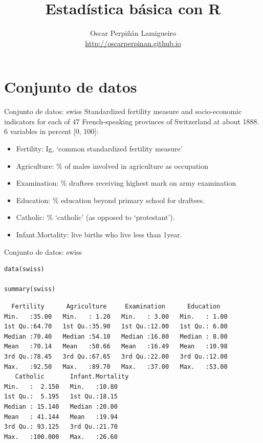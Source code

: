 \documentclass[xcolor={usenames,svgnames,dvipsnames}]{beamer}
\author{Oscar Perpiñán Lamigueiro \\ \url{http://oscarperpinan.github.io}}
\date{}
\title{Estadística básica con R}
\begin{document}
\maketitle

\section{Conjunto de datos}
\label{sec-1}

\begin{frame}[label=sec-1-1]{Conjunto de datos: swiss}
Standardized fertility measure and socio-economic indicators for
each of 47 French-speaking provinces of Switzerland at
about 1888. 6 variables in percent [0, 100]:

\begin{itemize}
\item \alert{Fertility}:         Ig, ‘common standardized fertility measure’
\item \alert{Agriculture}:       \% of males involved in agriculture as occupation
\item \alert{Examination}:       \% draftees receiving highest mark on army examination
\item \alert{Education}:         \% education beyond primary school for draftees.
\item \alert{Catholic}:          \% ‘catholic’ (as opposed to ‘protestant’).
\item \alert{Infant.Mortality}:  live births who live less than 1year.
\end{itemize}
\end{frame}
\begin{frame}[fragile,label=sec-1-2]{Conjunto de datos: swiss}
 \lstset{language=R,numbers=none}
\begin{lstlisting}
data(swiss)

summary(swiss)
\end{lstlisting}

\begin{verbatim}
  Fertility      Agriculture     Examination      Education    
Min.   :35.00   Min.   : 1.20   Min.   : 3.00   Min.   : 1.00  
1st Qu.:64.70   1st Qu.:35.90   1st Qu.:12.00   1st Qu.: 6.00  
Median :70.40   Median :54.10   Median :16.00   Median : 8.00  
Mean   :70.14   Mean   :50.66   Mean   :16.49   Mean   :10.98  
3rd Qu.:78.45   3rd Qu.:67.65   3rd Qu.:22.00   3rd Qu.:12.00  
Max.   :92.50   Max.   :89.70   Max.   :37.00   Max.   :53.00  
   Catholic       Infant.Mortality
Min.   :  2.150   Min.   :10.80   
1st Qu.:  5.195   1st Qu.:18.15   
Median : 15.140   Median :20.00   
Mean   : 41.144   Mean   :19.94   
3rd Qu.: 93.125   3rd Qu.:21.70   
Max.   :100.000   Max.   :26.60
\end{verbatim}
\end{frame}
\end{document}
